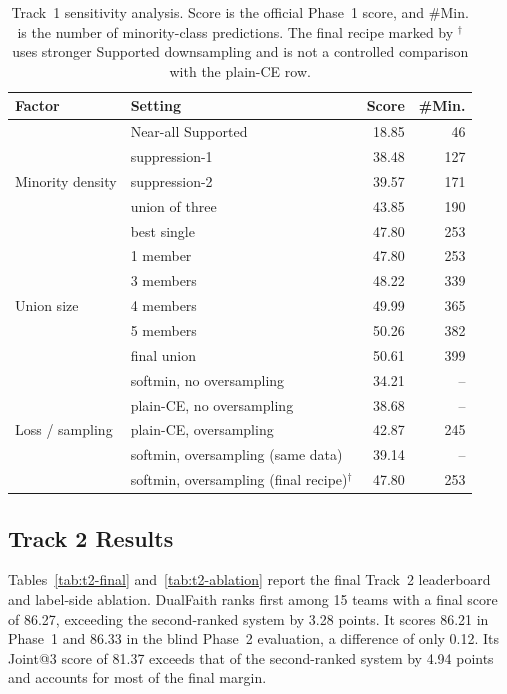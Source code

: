 \documentclass[runningheads]{llncs}
\makeatletter
\newcommand{\method}{DualFaith}
\newcommand{\joint}{Joint@3}
\newcommand{\lab}[1]{\textsf{\small #1}}
\newcommand{\best}[1]{#1}
\makeatother
\begin{document}
\begin{table}[H]
\centering
\caption{Track~1 sensitivity analysis. Score is the official Phase~1 score, and \#Min. is the number of minority-class predictions. The final recipe marked by $^{\dagger}$ uses stronger \lab{Supported} downsampling and is not a controlled comparison with the plain-CE row.}
\label{tab:t1-results}
\small
\begin{tabular}{llrr}
\toprule
Factor & Setting & Score & \#Min.\\
\midrule
\multirow{5}{*}{Minority density} & Near-all \lab{Supported} & 18.85 & 46\\
& suppression-1 & 38.48 & 127\\
& suppression-2 & 39.57 & 171\\
& union of three & 43.85 & 190\\
& best single & 47.80 & 253\\
\midrule
\multirow{5}{*}{Union size} & 1 member & 47.80 & 253\\
& 3 members & 48.22 & 339\\
& 4 members & 49.99 & 365\\
& 5 members & 50.26 & 382\\
& final union & \best{50.61} & 399\\
\midrule
\multirow{5}{*}{Loss / sampling} & softmin, no oversampling & 34.21 & --\\
& plain-CE, no oversampling & 38.68 & --\\
& plain-CE, oversampling & 42.87 & 245\\
& softmin, oversampling (same data) & 39.14 & --\\
& softmin, oversampling (final recipe)$^{\dagger}$ & 47.80 & 253\\
\bottomrule
\end{tabular}
\end{table}

\subsection{Track 2 Results}
Tables~\ref{tab:t2-final} and~\ref{tab:t2-ablation} report the final Track~2 leaderboard and label-side ablation. \method{} ranks first among 15 teams with a final score of 86.27, exceeding the second-ranked system by 3.28 points. It scores 86.21 in Phase~1 and 86.33 in the blind Phase~2 evaluation, a difference of only 0.12. Its \joint{} score of 81.37 exceeds that of the second-ranked system by 4.94 points and accounts for most of the final margin.
\end{document}

